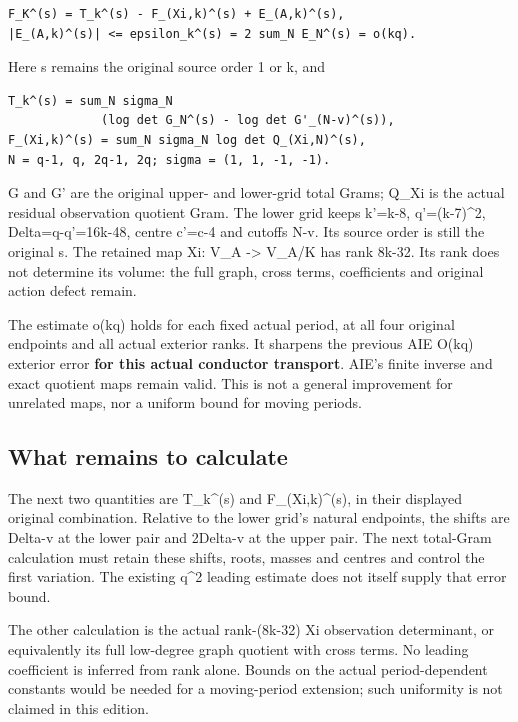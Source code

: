 \documentclass[
]{article}
\begin{document}
\begin{verbatim}
F_K^(s) = T_k^(s) - F_(Xi,k)^(s) + E_(A,k)^(s),
|E_(A,k)^(s)| <= epsilon_k^(s) = 2 sum_N E_N^(s) = o(kq).
\end{verbatim}

Here s remains the original source order 1 or k, and

\begin{verbatim}
T_k^(s) = sum_N sigma_N
             (log det G_N^(s) - log det G'_(N-v)^(s)),
F_(Xi,k)^(s) = sum_N sigma_N log det Q_(Xi,N)^(s),
N = q-1, q, 2q-1, 2q; sigma = (1, 1, -1, -1).
\end{verbatim}

G and G' are the original upper- and lower-grid total Grams; Q\_Xi is
the actual residual observation quotient Gram. The lower grid keeps
k'=k-8, q'=(k-7)\^{}2, Delta=q-q'=16k-48, centre c'=c-4 and cutoffs N-v.
Its source order is still the original s. The retained map Xi: V\_A
-\textgreater{} V\_A/K has rank 8k-32. Its rank does not determine its
volume: the full graph, cross terms, coefficients and original action
defect remain.

The estimate o(kq) holds for each fixed actual period, at all four
original endpoints and all actual exterior ranks. It sharpens the
previous AIE O(kq) exterior error \textbf{for this actual conductor
transport}. AIE's finite inverse and exact quotient maps remain valid.
This is not a general improvement for unrelated maps, nor a uniform
bound for moving periods.

\subsection{What remains to
calculate}\label{what-remains-to-calculate-5}

The next two quantities are T\_k\^{}(s) and F\_(Xi,k)\^{}(s), in their
displayed original combination. Relative to the lower grid's natural
endpoints, the shifts are Delta-v at the lower pair and 2Delta-v at the
upper pair. The next total-Gram calculation must retain these shifts,
roots, masses and centres and control the first variation. The existing
q\^{}2 leading estimate does not itself supply that error bound.

The other calculation is the actual rank-(8k-32) Xi observation
determinant, or equivalently its full low-degree graph quotient with
cross terms. No leading coefficient is inferred from rank alone. Bounds
on the actual period-dependent constants would be needed for a
moving-period extension; such uniformity is not claimed in this edition.
\end{document}
